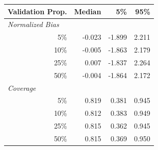 \begin{tabular}[t]{r|rrr}
\toprule
Validation Prop. & Median & 5\% & 95\% \\
\midrule
\multicolumn{1}{l|}{\textit{Normalized Bias}} \\
5\% & -0.023 & -1.899 & 2.211 \\
10\% & -0.005 & -1.863 & 2.179 \\
25\% & 0.007 & -1.837 & 2.264 \\ 
50\% & -0.004 & -1.864 & 2.172 \\
\midrule 
\multicolumn{1}{l|}{\textit{Coverage}} \\
5\% & 0.819 & 0.381 & 0.945 \\
10\% & 0.812 & 0.383 & 0.949 \\
25\% & 0.815 & 0.362 & 0.945 \\
50\% & 0.815 & 0.369 & 0.950 \\
\bottomrule
\end{tabular}